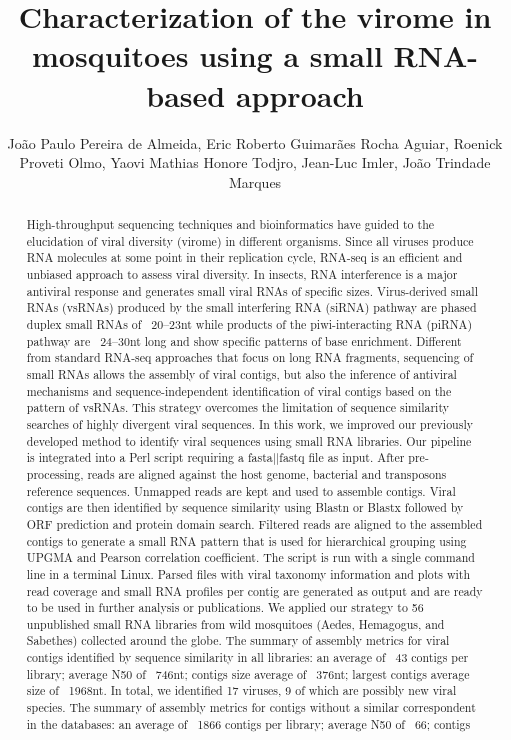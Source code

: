 \documentclass[twoside]{article}
\title{\vspace{-15mm}\fontsize{24pt}{10pt}\selectfont\textbf{ Characterization of the virome in mosquitoes using a small RNA-based approach }} %
\author{ Jo\~ao Paulo Pereira de Almeida, Eric Roberto Guimar\~aes Rocha Aguiar, Roenick Proveti Olmo, Yaovi Mathias Honore Todjro, Jean-Luc Imler, Jo\~ao Trindade Marques }
\affil{ Universidade Federal da Bahia }
\date{}
\begin{document}
  
  
  \maketitle %
  
  
  \thispagestyle{fancy} %
  
  
  \begin{abstract}
  High-throughput sequencing techniques and bioinformatics have guided to the elucidation of viral diversity (virome) in different organisms. Since all viruses produce RNA molecules at some point in their replication cycle,  RNA-seq is an efficient and unbiased approach to assess viral diversity. In insects,  RNA interference is a major antiviral response and generates small viral RNAs of specific sizes. Virus-derived small RNAs (vsRNAs) produced by the small interfering RNA (siRNA) pathway are phased duplex small RNAs of ~20–23nt while products of the piwi-interacting RNA (piRNA) pathway are ~24–30nt long and show specific patterns of base enrichment. Different from standard RNA-seq approaches that focus on long RNA fragments,  sequencing of small RNAs allows the assembly of viral contigs,  but also the inference of antiviral mechanisms and sequence-independent identification of viral contigs based on the pattern of vsRNAs. This strategy overcomes the limitation of sequence similarity searches of highly divergent viral sequences. In this work,  we improved our previously developed method to identify viral sequences using small RNA libraries. Our pipeline is integrated into a Perl script requiring a fasta||fastq file as input. After pre-processing,  reads are aligned against the host genome,  bacterial and transposons reference sequences. Unmapped reads are kept and used to assemble contigs. Viral contigs are then identified by sequence similarity using Blastn or Blastx followed by ORF prediction and protein domain search. Filtered reads are aligned to the assembled contigs to generate a small RNA pattern that is used for hierarchical grouping using UPGMA and Pearson correlation coefficient. The script is run with a single command line in a terminal Linux. Parsed files with viral taxonomy information and plots with read coverage and small RNA profiles per contig are generated as output and are ready to be used in further analysis or publications. We applied our strategy to 56 unpublished small RNA libraries from wild mosquitoes (Aedes,  Hemagogus,  and Sabethes) collected around the globe. The summary of assembly metrics for viral contigs identified by sequence similarity in all libraries: an average of ~43 contigs per library; average N50 of ~746nt; contigs size average of ~376nt; largest contigs average size of ~1968nt. In total,  we identified 17 viruses,  9 of which are possibly new viral species. The summary of assembly metrics for contigs without a similar correspondent in the databases: an average of ~1866 contigs per library; average N50 of ~66; contigs 
\end{abstract}
\end{document}
